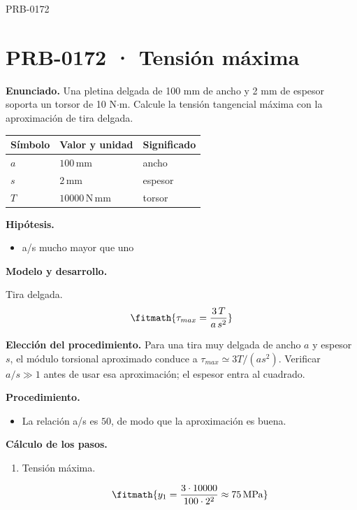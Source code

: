 \begin{studiumworked}{PRB-0172}

\section{PRB-0172 · Tensión máxima}

\textbf{Enunciado.} Una pletina delgada de 100 mm de ancho y 2 mm de espesor soporta un torsor de 10 N$\cdot$m. Calcule la tensión tangencial máxima con la aproximación de tira delgada.

\par\medskip\noindent\begin{tabular}{@{}p{.18\linewidth}p{.26\linewidth}p{.48\linewidth}@{}}
\toprule Símbolo & Valor y unidad & Significado\\\midrule
$a$ & $100\,\mathrm{mm}$ & ancho\\
$s$ & $2\,\mathrm{mm}$ & espesor\\
$T$ & $10000\,\mathrm{N\,mm}$ & torsor\\
\bottomrule\end{tabular}\par\medskip

\textbf{Hipótesis.}\begin{itemize}\item a/s mucho mayor que uno\end{itemize}

\textbf{Modelo y desarrollo.}

Tira delgada.\[\fitmath{\tau_{max} = \frac{3\,T}{a\,s^{2}}}\]

\textbf{Elección del procedimiento.} Para una tira muy delgada de ancho $a$ y espesor $s$, el módulo torsional aproximado conduce a $\tau_{max}\simeq3T/(as^2)$. Verificar $a/s\gg1$ antes de usar esa aproximación; el espesor entra al cuadrado.

\textbf{Procedimiento.}\begin{itemize}\item La relación a/s es $50$, de modo que la aproximación es buena.\end{itemize}

\textbf{Cálculo de los pasos.}

\begin{enumerate}

\item Tensión máxima.

\[\fitmath{y_{1}=\frac{3\cdot 10000}{100\cdot {2}^{2}}\approx 75\,\mathrm{MPa}}\]


\end{enumerate}
\end{studiumworked}
